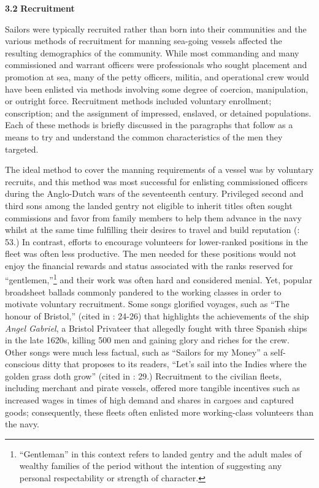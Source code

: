 \textbf{3.2} \textbf{Recruitment}

  Sailors were typically recruited rather than born into their communities and the various methods of recruitment for manning sea-going vessels affected the resulting demographics of the community. While most commanding and many commissioned and warrant officers were professionals who sought placement and promotion at sea, many of the petty officers, militia, and operational crew would have been enlisted via methods involving some degree of coercion, manipulation, or outright force. Recruitment methods included voluntary enrollment; conscription; and the assignment of impressed, enslaved, or detained populations. Each of these methods is briefly discussed in the paragraphs that follow as a means to try and understand the common characteristics of the men they targeted. 

  The ideal method to cover the manning requirements of a vessel was by voluntary recruits, and this method was most successful for enlisting commissioned officers during the Anglo-Dutch wars of the seventeenth century. Privileged second and third sons among the landed gentry not eligible to inherit titles often sought commissions and favor from family members to help them advance in the navy whilst at the same time fulfilling their desires to travel and build reputation (\citealt{Brown2011}: 53.) In contrast, efforts to encourage volunteers for lower-ranked positions in the fleet was often less productive. The men needed for these positions would not enjoy the financial rewards and status associated with the ranks reserved for “gentlemen,”\footnote{“Gentleman” in this context refers to landed gentry and the adult males of wealthy families of the period without the intention of suggesting any personal respectability or strength of character.}  and their work was often hard and considered menial. Yet, popular broadsheet ballads commonly pandered to the working classes in order to motivate voluntary recruitment. Some songs glorified voyages, such as “The honour of Bristol,” (cited in \citealt{Palmer1986}: 24-26) that highlights the achievements of the ship \textit{Angel Gabriel}, a Bristol Privateer that allegedly fought with three Spanish ships in the late 1620s, killing 500 men and gaining glory and riches for the crew. Other songs were much less factual, such as “Sailors for my Money” a self-conscious ditty that proposes to its readers, “Let’s sail into the Indies where the golden grass doth grow” (cited in \citealt{Palmer1986}: 29.) Recruitment to the civilian fleets, including merchant and pirate vessels, offered more tangible incentives such as increased wages in times of high demand and shares in cargoes and captured goods; consequently, these fleets often enlisted more working-class volunteers than the navy. 

